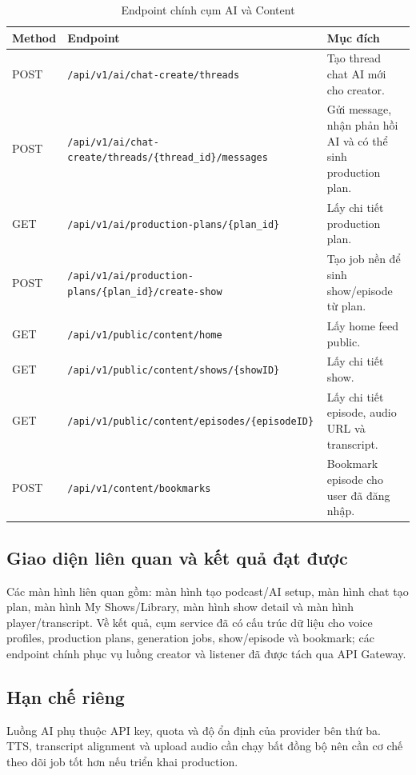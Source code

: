 \documentclass[14pt,a4paper,oneside]{extreport}
\begin{document}
\begin{table}[H]
\centering
\caption{Endpoint chính cụm AI và Content}
\label{tab:endpoint-ai-content}
\renewcommand{\arraystretch}{1.3}
\scriptsize
\begin{tabularx}{\textwidth}{|l|l|X|}
\hline
\textbf{Method} & \textbf{Endpoint} & \textbf{Mục đích} \\
\hline
POST & \texttt{/api/v1/ai/chat-create/threads} & Tạo thread chat AI mới cho creator. \\
\hline
POST & \texttt{/api/v1/ai/chat-create/threads/\{thread\_id\}/messages} & Gửi message, nhận phản hồi AI và có thể sinh production plan. \\
\hline
GET & \texttt{/api/v1/ai/production-plans/\{plan\_id\}} & Lấy chi tiết production plan. \\
\hline
POST & \texttt{/api/v1/ai/production-plans/\{plan\_id\}/create-show} & Tạo job nền để sinh show/episode từ plan. \\
\hline
GET & \texttt{/api/v1/public/content/home} & Lấy home feed public. \\
\hline
GET & \texttt{/api/v1/public/content/shows/\{showID\}} & Lấy chi tiết show. \\
\hline
GET & \texttt{/api/v1/public/content/episodes/\{episodeID\}} & Lấy chi tiết episode, audio URL và transcript. \\
\hline
POST & \texttt{/api/v1/content/bookmarks} & Bookmark episode cho user đã đăng nhập. \\
\hline
\end{tabularx}
\end{table}

\subsection{Giao diện liên quan và kết quả đạt được}

Các màn hình liên quan gồm: màn hình tạo podcast/AI setup, màn hình chat tạo plan, màn hình My Shows/Library, màn hình show detail và màn hình player/transcript. Về kết quả, cụm service đã có cấu trúc dữ liệu cho voice profiles, production plans, generation jobs, show/episode và bookmark; các endpoint chính phục vụ luồng creator và listener đã được tách qua API Gateway.

\subsection{Hạn chế riêng}

Luồng AI phụ thuộc API key, quota và độ ổn định của provider bên thứ ba. TTS, transcript alignment và upload audio cần chạy bất đồng bộ nên cần cơ chế theo dõi job tốt hơn nếu triển khai production.
\end{document}
